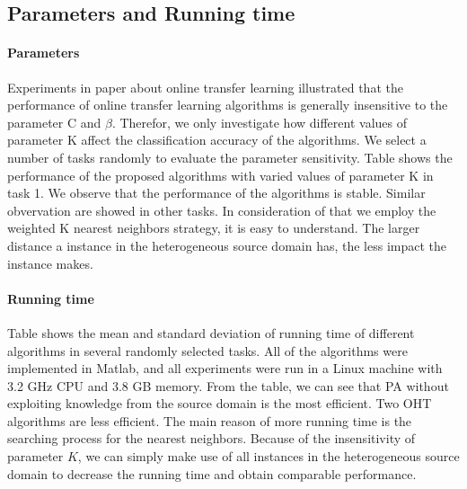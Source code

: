 \documentclass[twocolumn]{article}
\begin{document}
\subsection{Parameters and Running time}
\paragraph{Parameters}
Experiments in paper about online transfer learning illustrated that the performance of online transfer learning algorithms is generally insensitive to the parameter C and $\beta$.
Therefor, we only investigate how different values of parameter K affect the classification accuracy of the algorithms.
We select a number of tasks randomly to evaluate the parameter sensitivity.
Table shows the performance of the proposed algorithms with varied values of parameter K in task 1.
We observe that the performance of the algorithms is stable.
Similar obvervation are showed in other tasks.
In consideration of that we employ the weighted K nearest neighbors strategy, it is easy to understand.
The larger distance a instance in the heterogeneous source domain has, the less impact the instance makes.


\paragraph{Running time}
Table shows the mean and standard deviation of running time of different algorithms in several randomly selected tasks.
All of the algorithms were implemented in Matlab, and all experiments were run in a Linux machine with 3.2 GHz CPU and 3.8 GB memory.
From the table, we can see that PA without exploiting knowledge from the source domain is the most efficient.
Two OHT algorithms are less efficient.
The main reason of more running time is the searching process for the nearest neighbors.
Because of the insensitivity of parameter $K$, we can simply make use of all instances in the heterogeneous source domain to decrease the running time and obtain comparable performance.
\end{document}
